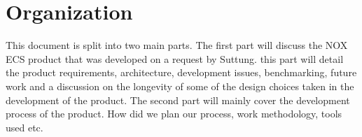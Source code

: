 \section{Organization}
This document is split into two main parts.
The first part will discuss the NOX ECS product that was developed
on a request by Suttung.
this part will detail the product requirements, architecture,
development issues, benchmarking, future work and a discussion on the longevity
of some of the design choices taken in the development of the product.
The second part will mainly cover the development process of the product.
How did we plan our process, work methodology, tools used etc.
